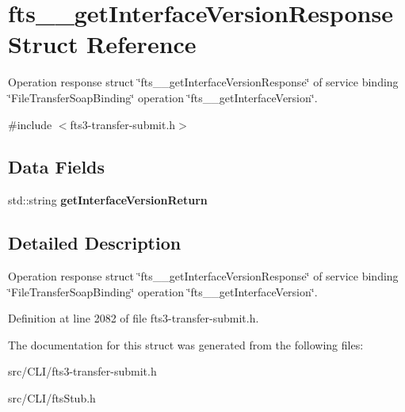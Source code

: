 \section{fts\_\-\_\-getInterfaceVersionResponse Struct Reference}
\label{structfts____getInterfaceVersionResponse}


Operation response struct \char`\"{}fts\_\-\_\-getInterfaceVersionResponse\char`\"{} of service binding \char`\"{}FileTransferSoapBinding\char`\"{} operation \char`\"{}fts\_\-\_\-getInterfaceVersion\char`\"{}.  




{\ttfamily \#include $<$fts3-\/transfer-\/submit.h$>$}

\subsection*{Data Fields}
\begin{DoxyCompactItemize}
\item 
std::string {\bfseries getInterfaceVersionReturn}\label{structfts____getInterfaceVersionResponse_a0a7afb082e8c2db3bffc92e6cfe9105c}

\end{DoxyCompactItemize}


\subsection{Detailed Description}
Operation response struct \char`\"{}fts\_\-\_\-getInterfaceVersionResponse\char`\"{} of service binding \char`\"{}FileTransferSoapBinding\char`\"{} operation \char`\"{}fts\_\-\_\-getInterfaceVersion\char`\"{}. 

Definition at line 2082 of file fts3-\/transfer-\/submit.h.



The documentation for this struct was generated from the following files:\begin{DoxyCompactItemize}
\item 
src/CLI/fts3-\/transfer-\/submit.h\item 
src/CLI/ftsStub.h\end{DoxyCompactItemize}
